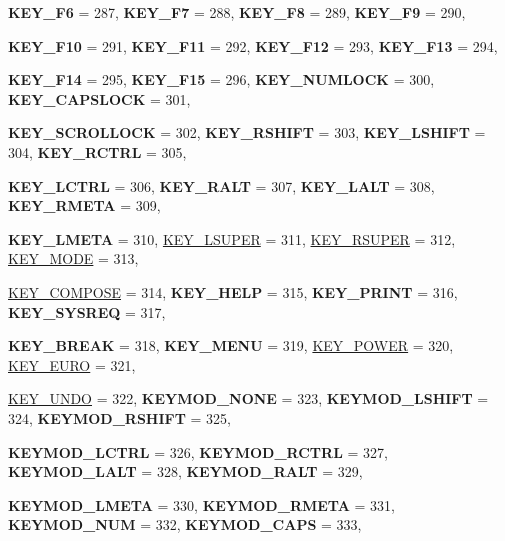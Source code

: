 \begin{DoxyCompactItemize}
\par
{\bfseries KEY\_\-F6} =  287, 
{\bfseries KEY\_\-F7} =  288, 
{\bfseries KEY\_\-F8} =  289, 
{\bfseries KEY\_\-F9} =  290, 
\par
{\bfseries KEY\_\-F10} =  291, 
{\bfseries KEY\_\-F11} =  292, 
{\bfseries KEY\_\-F12} =  293, 
{\bfseries KEY\_\-F13} =  294, 
\par
{\bfseries KEY\_\-F14} =  295, 
{\bfseries KEY\_\-F15} =  296, 
{\bfseries KEY\_\-NUMLOCK} =  300, 
{\bfseries KEY\_\-CAPSLOCK} =  301, 
\par
{\bfseries KEY\_\-SCROLLOCK} =  302, 
{\bfseries KEY\_\-RSHIFT} =  303, 
{\bfseries KEY\_\-LSHIFT} =  304, 
{\bfseries KEY\_\-RCTRL} =  305, 
\par
{\bfseries KEY\_\-LCTRL} =  306, 
{\bfseries KEY\_\-RALT} =  307, 
{\bfseries KEY\_\-LALT} =  308, 
{\bfseries KEY\_\-RMETA} =  309, 
\par
{\bfseries KEY\_\-LMETA} =  310, 
\hyperlink{classMetaCode_a7390e6f58e25c0ce377bba4e63081b24a6404942e1d26f745d17c7a508c0ffa55}{KEY\_\-LSUPER} =  311, 
\hyperlink{classMetaCode_a7390e6f58e25c0ce377bba4e63081b24a729875d449534841cde46b53777f7753}{KEY\_\-RSUPER} =  312, 
\hyperlink{classMetaCode_a7390e6f58e25c0ce377bba4e63081b24a79956c29fd4e16e82532643471b79aaa}{KEY\_\-MODE} =  313, 
\par
\hyperlink{classMetaCode_a7390e6f58e25c0ce377bba4e63081b24a386e42ccb1fbb297d9b672ed8064871c}{KEY\_\-COMPOSE} =  314, 
{\bfseries KEY\_\-HELP} =  315, 
{\bfseries KEY\_\-PRINT} =  316, 
{\bfseries KEY\_\-SYSREQ} =  317, 
\par
{\bfseries KEY\_\-BREAK} =  318, 
{\bfseries KEY\_\-MENU} =  319, 
\hyperlink{classMetaCode_a7390e6f58e25c0ce377bba4e63081b24ad546e765e064929fb89556bd5f581756}{KEY\_\-POWER} =  320, 
\hyperlink{classMetaCode_a7390e6f58e25c0ce377bba4e63081b24a9c203a1b83ec1bb0a29bbcd71fcc6363}{KEY\_\-EURO} =  321, 
\par
\hyperlink{classMetaCode_a7390e6f58e25c0ce377bba4e63081b24a0bbef750535825d14bef6d8369dfe61f}{KEY\_\-UNDO} =  322, 
{\bfseries KEYMOD\_\-NONE} =  323, 
{\bfseries KEYMOD\_\-LSHIFT} =  324, 
{\bfseries KEYMOD\_\-RSHIFT} =  325, 
\par
{\bfseries KEYMOD\_\-LCTRL} =  326, 
{\bfseries KEYMOD\_\-RCTRL} =  327, 
{\bfseries KEYMOD\_\-LALT} =  328, 
{\bfseries KEYMOD\_\-RALT} =  329, 
\par
{\bfseries KEYMOD\_\-LMETA} =  330, 
{\bfseries KEYMOD\_\-RMETA} =  331, 
{\bfseries KEYMOD\_\-NUM} =  332, 
{\bfseries KEYMOD\_\-CAPS} =  333, 
\par

\end{DoxyCompactItemize}
